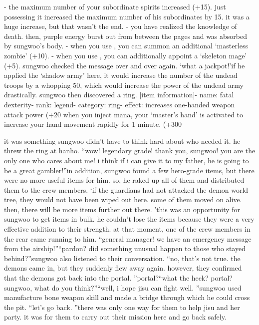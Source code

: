 - the maximum number of your subordinate spirits increased (+15).
just possessing it increased the maximum number of his subordinates by 15.
 it was a huge increase, but that wasn’t the end.
- you have realized the knowledge of death.
then, purple energy burst out from between the pages and was absorbed by sungwoo’s body.
- when you use , you can summon an additional ‘masterless zombie’ (+10).
- when you use , you can additionally appoint a ‘skeleton mage’ (+5).
sungwoo checked the message over and over again.
‘what a jackpot!’if he applied the ‘shadow army’ here, it would increase the number of the undead troops by a whopping 50, which would increase the power of the undead army drastically.
sungwoo then discovered a ring.
[item information]- name: fatal dexterity- rank: legend- category: ring- effect: increases one-handed weapon attack power (+20%
 when you inject mana, your ‘master’s hand’ is activated to increase your hand movement rapidly for 1 minute.
 (+300%

it was something sungwoo didn’t have to think hard about who needed it.
 he threw the ring at hanho.
“wow! legendary grade! thank you, sungwoo! you are the only one who cares about me! i think if i can give it to my father, he is going to be a great gambler!”in addition, sungwoo found a few hero-grade items, but there were no more useful items for him.
 so, he raked up all of them and distributed them to the crew members.
‘if the guardians had not attacked the demon world tree, they would not have been wiped out here.
 some of them moved on alive.
 then, there will be more items further out there.
’this was an opportunity for sungwoo to get items in bulk.
 he couldn’t lose the items because they were a very effective addition to their strength.
at that moment, one of the crew members in the rear came running to him.
“general manager! we have an emergency message from the airship!”“pardon? did something unusual happen to those who stayed behind?”sungwoo also listened to their conversation.
“no, that’s not true.
 the demons came in, but they suddenly flew away again.
 however, they confirmed that the demons got back into the portal.
”portal?“what the heck? portal? sungwoo, what do you think?”“well, i hope jisu can fight well.
”sungwoo used manufacture bone weapon skill and made a bridge through which he could cross the pit.
“let’s go back.
”there was only one way for them to help jisu and her party.
 it was for them to carry out their mission here and go back safely.


 